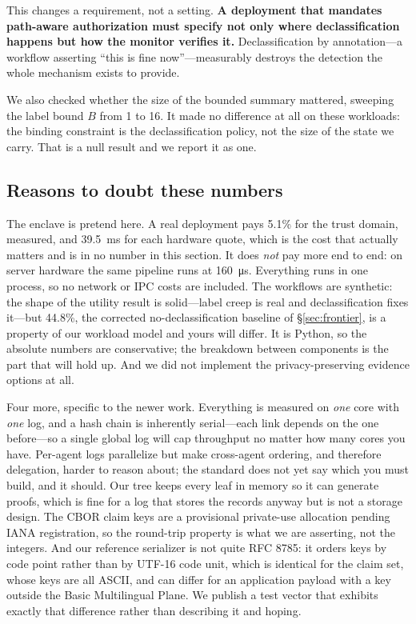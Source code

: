 \documentclass[11pt]{article}
\begin{document}
This changes a requirement, not a setting. \textbf{A deployment that mandates
path-aware authorization must specify not only where declassification happens
but how the monitor verifies it.} Declassification by annotation---a workflow
asserting ``this is fine now''---measurably destroys the detection the whole
mechanism exists to provide.

We also checked whether the size of the bounded summary mattered, sweeping the
label bound $B$ from 1 to 16. It made no difference at all on these workloads:
the binding constraint is the declassification policy, not the size of the
state we carry. That is a null result and we report it as one.

\subsection{Reasons to doubt these numbers}
The enclave is pretend here. A real deployment pays 5.1\% for the trust domain,
measured, and \SI{39.5}{\milli\second} for each hardware quote, which is the
cost that actually matters and is in no number in this section. It does
\emph{not} pay more end to end: on server hardware the same pipeline runs at
\SI{160}{\micro\second}. Everything runs in one process, so no network or IPC
costs are included. The workflows are synthetic: the shape of the utility
result is solid---label creep is real and declassification fixes it---but
44.8\%, the corrected no-declassification baseline of \S\ref{sec:frontier},
is a property of our workload model and yours will differ. It is
Python, so the absolute numbers are conservative; the breakdown between
components is the part that will hold up. And we did not implement the
privacy-preserving evidence options at all.

Four more, specific to the newer work. Everything is measured on \emph{one}
core with \emph{one} log, and a hash chain is inherently serial---each link
depends on the one before---so a single global log will cap throughput no
matter how many cores you have. Per-agent logs parallelize but make cross-agent
ordering, and therefore delegation, harder to reason about; the standard does
not yet say which you must build, and it should. Our tree keeps every leaf in
memory so it can generate proofs, which is fine for a log that stores the
records anyway but is not a storage design. The CBOR claim keys are a
provisional private-use allocation pending IANA registration, so the round-trip
property is what we are asserting, not the integers. And our reference
serializer is not quite RFC 8785: it orders keys by code point rather than by
UTF-16 code unit, which is identical for the claim set, whose keys are all
ASCII, and can differ for an application payload with a key outside the Basic
Multilingual Plane. We publish a test vector that exhibits exactly that
difference rather than describing it and hoping.
\end{document}
